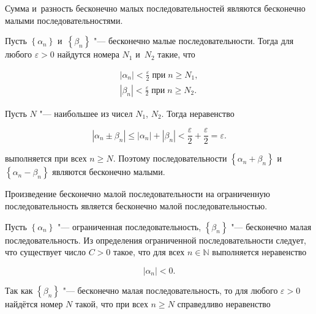 \begin{Th}\label{th:3_2_1_1}
Сумма и~разность бесконечно малых последовательностей являются бесконечно
малыми последовательностями.
\end{Th}

Пусть $\left\{ \alpha_{n} \right\}$ и~$\left\{ \beta_{n} \right\}$
"---  бесконечно малые последовательности. Тогда для любого $\varepsilon > 0$
найдутся номера $N_{1}$ и~$N_{2}$ такие, что

\begin{gather*}
\displaystyle \left| \alpha_{n} \right| < \frac{\varepsilon}{2} \;
\text{при} \; n \geqslant N_{1}, \\
\displaystyle \left| \beta_{n} \right| < \frac{\varepsilon}{2} \;
\text{при} \; n \geqslant N_{2}.
\end{gather*}

\noindent
Пусть $N$ "--- наибольшее из чисел $N_{1}$, $N_{2}$.
Тогда неравенство

\begin{equation*}
\left| \alpha_{n} \pm \beta_{n} \right| \leqslant
\left| \alpha_{n} \right| + \left| \beta_{n} \right| < 
\displaystyle \frac{\varepsilon}{2} + \frac{\varepsilon}{2} = \varepsilon.
\end{equation*}

\noindent
выполняется при всех $n \geqslant N$.
Поэтому последовательности
$\left\{ \alpha_{n} + \beta_{n} \right\}$ и~$\left\{ \alpha_{n} - \beta_{n}\right\}$
являются бесконечно малыми.

\begin{Th}\label{th:3_2_1_2}
Произведение бесконечно малой последовательности на ограниченную последовательность
является бесконечно малой последовательностью.
\end{Th}

Пусть $\left\{ \alpha_{n} \right\}$ "--- ограниченная последовательность,
$\left\{ \beta_{n} \right\}$ "--- бесконечно малая последовательность.
Из определения ограниченной последовательности следует, что существует число
$C > 0$ такое, что для всех $n \in \mathbb{N}$ выполняется неравенство

\begin{equation*}
\left| \alpha_{n} \right| < 0.
\end{equation*}

\noindent
Так как $\left\{ \beta_{n} \right\}$ "--- бесконечно малая последовательность,
то для любого $\varepsilon > 0$ найдётся номер $N$ такой, что при всех
$n \geqslant N$ справедливо неравенство

